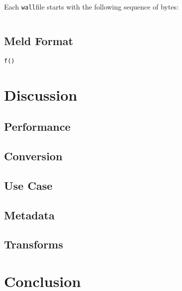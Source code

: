 \documentclass[11pt,a4paper,twocolumn]{article}
\newcommand{\wall}{\texttt{wall}}
\begin{document}
Each \wall file starts with the following sequence of bytes:

\begin{lstlisting}[frame=single]  % Start your code-block

\end{lstlisting}


\subsection{Meld Format}
\label{sec:meld_spec}

\lstset{language=python}
\begin{lstlisting}[frame=single]  % Start your code-block
f()
\end{lstlisting}

\section{Discussion}
\label{sec:discussion}


\subsection{Performance}


\subsection{Conversion}


\subsection{Use Case}


\subsection{Metadata}


\subsection{Transforms}

\section{Conclusion}
\label{sec:conclusion}


\end{document}
